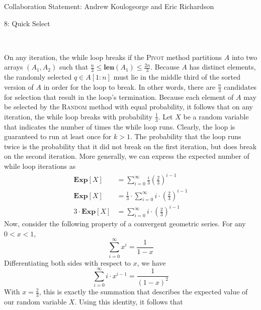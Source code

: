 \documentclass[12pt]{article}
\begin{document}

Collaboration Statement: Andrew Koulogeorge and Eric Richardson 

\begin{problem}{8: Quick Select}
\end{problem}
\begin{solution} \ \\
    \begin{subprob}
        \item On any iteration, the while loop breaks if the \textsc{Pivot} method partitions $A$ into two arrays $(A_1, A_2)$ such that $\frac{n}{3} \leq \textbf{len}(A_1) \leq \frac{2n}{3}$. Because $A$ has distinct elements, the randomly selected $q \in A[1 : n]$ must lie in the middle third of the sorted version of $A$ in order for the loop to break. In other words, there are $\frac{n}{3}$ candidates for selection that result in the loop's termination. Because each element of $A$ may be selected by the \textsc{Random} method with equal probability, it follows that on any iteration, the while loop breaks with probability $\frac{1}{3}$.  Let $X$ be a random variable that indicates the number of times the while loop runs. Clearly, the loop is guaranteed to run at least once for $k > 1$. The probability that the loop runs twice is the probability that it did not break on the first iteration, but does break on the second iteration. More generally, we can express the expected number of while loop iterations as 
        \begin{align*}
            \textbf{Exp}[X] &= \sum\limits_{i=0}^{\infty} \frac{i}{3} \left(\frac{2}{3}\right)^{i-1} \\
                     \textbf{Exp}[X] &= \frac{1}{3} \cdot \sum\limits_{i=0}^{\infty} i \cdot \left(\frac{2}{3}\right)^{i-1} \\
                     3 \cdot \textbf{Exp}[X] &= \sum\limits_{i=0}^{\infty} i \cdot \left(\frac{2}{3}\right)^{i-1}
        \end{align*}
        Now, consider the following property of a convergent geometric series. For any $0 < x < 1$, 
        \[
        \sum\limits_{i=0}^{\infty}x^i = \frac{1}{1-x}
        \]
        Differentiating both sides with respect to $x$, we have
        \[
        \sum\limits_{i=0}^{\infty}i \cdot x^{i-1} = \frac{1}{(1-x)^2}
        \]
        With $x=\frac{2}{3}$, this is exactly the summation that describes the expected value of our random variable $X$. Using this identity, it follows that

\end{subprob}
\end{solution}
\end{document}
